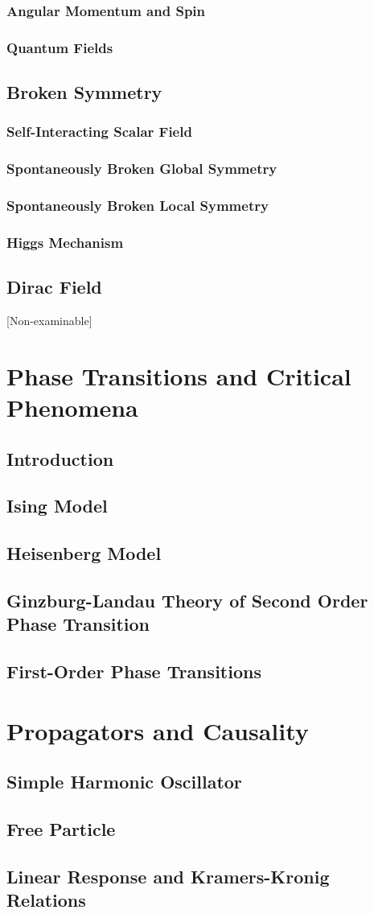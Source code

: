 \documentclass[a4paper]{article}
\theoremstyle{new}
\begin{document}
\subsubsection{Angular Momentum and Spin}
\newpage
\subsubsection{Quantum Fields}
\newpage
\subsection{Broken Symmetry}
\subsubsection{Self-Interacting Scalar Field}
\subsubsection{Spontaneously Broken Global Symmetry}
\subsubsection{Spontaneously Broken Local Symmetry}
\subsubsection{Higgs Mechanism}
\newpage
\subsection{Dirac Field}
[Non-examinable]
\newpage
\section{Phase Transitions and Critical Phenomena}
\subsection{Introduction}
\subsection{Ising Model}
\subsection{Heisenberg Model}
\subsection{Ginzburg-Landau Theory of Second Order Phase Transition}
\subsection{First-Order Phase Transitions}
\newpage
\section{Propagators and Causality}
\subsection{Simple Harmonic Oscillator}
\subsection{Free Particle}
\subsection{Linear Response and Kramers-Kronig Relations}
\end{document}
